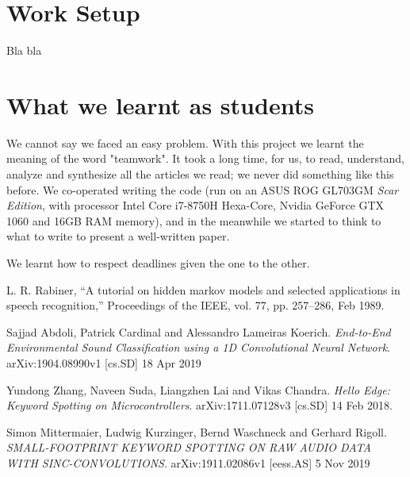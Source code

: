 \documentclass[conference]{IEEEtran}
\begin{document}
\section*{Work Setup}
Bla bla
\section*{What we learnt as students}
We cannot say we faced an easy problem. With this project we learnt the meaning of the word "teamwork". It took a long time, for us, to read, understand, analyze and synthesize all the articles we read; we never did something like this before. We co-operated writing the code (run on an ASUS ROG GL703GM \textit{Scar Edition}, with processor Intel Core i7-8750H Hexa-Core, Nvidia  GeForce GTX 1060 and 16GB RAM memory), and in the meanwhile we started to think to what to write to present a well-written paper.

We learnt how to respect deadlines given the one to the other.

\begin{thebibliography}{1}
L. R. Rabiner, “A tutorial on hidden markov models and selected applications in speech recognition,” Proceedings of the IEEE, vol. 77, pp. 257–286, Feb 1989.

Sajjad Abdoli, Patrick Cardinal and Alessandro Lameiras Koerich. \textit{End-to-End Environmental Sound Classification using a 1D Convolutional Neural Network}. arXiv:1904.08990v1 [cs.SD] 18 Apr 2019

Yundong Zhang, Naveen Suda, Liangzhen Lai and Vikas Chandra. \textit{Hello Edge: Keyword Spotting on Microcontrollers}. arXiv:1711.07128v3 [cs.SD] 14 Feb 2018.

Simon Mittermaier, Ludwig Kurzinger, Bernd Waschneck and Gerhard Rigoll. \textit{SMALL-FOOTPRINT KEYWORD SPOTTING ON RAW AUDIO DATA WITH SINC-CONVOLUTIONS}. arXiv:1911.02086v1 [eess.AS] 5 Nov 2019

\end{thebibliography}
\end{document}
